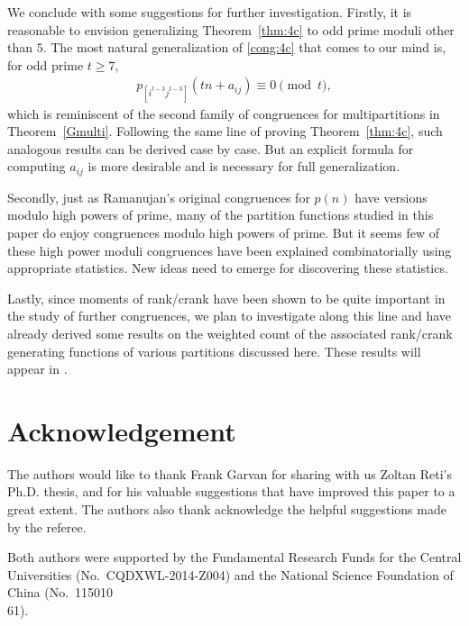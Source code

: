 \documentclass[12pt]{amsart}
\numberwithin{equation}{section}
\theoremstyle{plain}
\theoremstyle{definition}
\begin{document}
We conclude with some suggestions for further investigation. Firstly, it is reasonable to envision generalizing Theorem~\ref{thm:4c} to odd prime moduli other than $5$. The most natural generalization of \eqref{cong:4c} that comes to our mind is, for odd prime $t\geq 7$,
\begin{align*}
p_{[i^{t-3}j^{t-3}]}(tn+a_{ij})\equiv 0 \pmod t,
\end{align*}
which is reminiscent of the second family of congruences for multipartitions in Theorem~\ref{Gmulti}. Following the same line of proving Theorem~\ref{thm:4c}, such analogous results can be derived case by case. But an explicit formula for computing $a_{ij}$ is more desirable and is necessary for full generalization.

Secondly, just as Ramanujan's original congruences for $p(n)$ have versions modulo high powers of prime, many of the partition functions studied in this paper do enjoy congruences modulo high powers of prime. But it seems few of these high power moduli congruences have been explained combinatorially using appropriate statistics. New ideas need to emerge for discovering these statistics.

Lastly, since moments of rank/crank have been shown to be quite important in the study of further congruences, we plan to investigate along this line and have already derived some results on the weighted count of the associated rank/crank generating functions of various partitions discussed here. These results will appear in \cite{FT} .



\section*{Acknowledgement}
The authors would like to thank Frank Garvan for sharing with us Zoltan Reti's Ph.D. thesis, and for his valuable suggestions that have improved this paper to a great extent. The authors also thank acknowledge the helpful suggestions made by the referee.

Both authors were supported by the Fundamental Research Funds for the Central Universities (No.~CQDXWL-2014-Z004) and the National Science Foundation of China (No.~115010\\61).
\end{document}
